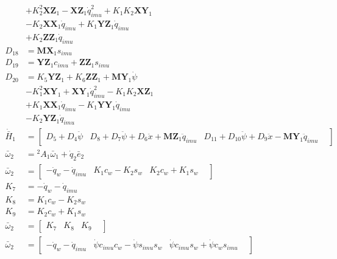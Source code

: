 \begin{align}
&+ K_{2}^2\mathbf{XZ}_1 - \mathbf{XZ}_1\dot{q}_{imu}^2 + K_{1}K_{2}\mathbf{XY}_1  \nonumber \\
&- K_{2}\mathbf{XX}_1\dot{q}_{imu} + K_{1}\mathbf{YZ}_1\dot{q}_{imu}  \nonumber \\
&+ K_{2}\mathbf{ZZ}_1\dot{q}_{imu} \nonumber \\
D_{18} &= \mathbf{MX}_1s_{imu} \nonumber \\
D_{19} &= \mathbf{YZ}_1c_{imu} + \mathbf{ZZ}_1s_{imu} \nonumber \\
D_{20} &= K_{5}\mathbf{YZ}_1 + K_{6}\mathbf{ZZ}_1 + \mathbf{MY}_1\dot{\psi}  \nonumber \\
&- K_{1}^2\mathbf{XY}_1 + \mathbf{XY}_1\dot{q}_{imu}^2 - K_{1}K_{2}\mathbf{XZ}_1  \nonumber \\
&+ K_{1}\mathbf{XX}_1\dot{q}_{imu} - K_{1}\mathbf{YY}_1\dot{q}_{imu}  \nonumber \\
&- K_{2}\mathbf{YZ}_1\dot{q}_{imu} \nonumber \\
 \dot{\bar{H}}_{1} &= \left[\begin{matrix} D_{5} + D_{4}\ddot{\psi} & D_{8} + D_{7}\ddot{\psi} + D_{6}\ddot{x} + \mathbf{MZ}_1\ddot{q}_{imu} & D_{11} + D_{10}\ddot{\psi} + D_{9}\ddot{x} - \mathbf{MY}_1\ddot{q}_{imu} &  \end{matrix}\right] 
 \nonumber \\ 
 \bar\omega_{2} &= {}^{2}A_{1} \bar\omega_{1} + \dot{q}_{2} \bar{e}_{2} 
 \nonumber \\ 
 \bar\omega_{2} &= \left[\begin{matrix} - \dot{q}_{w} - \dot{q}_{imu} & K_{1}c_{w} - K_{2}s_{w} & K_{2}c_{w} + K_{1}s_{w} &  \end{matrix}\right] 
 \nonumber \\ 
K_{7} &= - \dot{q}_{w} - \dot{q}_{imu} \nonumber \\
K_{8} &= K_{1}c_{w} - K_{2}s_{w} \nonumber \\
K_{9} &= K_{2}c_{w} + K_{1}s_{w} \nonumber \\
 \bar\omega_{2} &= \left[\begin{matrix} K_{7} & K_{8} & K_{9} &  \end{matrix}\right] 
 \nonumber \\ 
 \bar\omega_{2} &= \left[\begin{matrix} - \dot{q}_{w} - \dot{q}_{imu} & \dot{\psi}c_{imu}c_{w} - \dot{\psi}s_{imu}s_{w} & \dot{\psi}c_{imu}s_{w} + \dot{\psi}c_{w}s_{imu} &  \end{matrix}\right] 
 \nonumber \\ 

\end{align}
